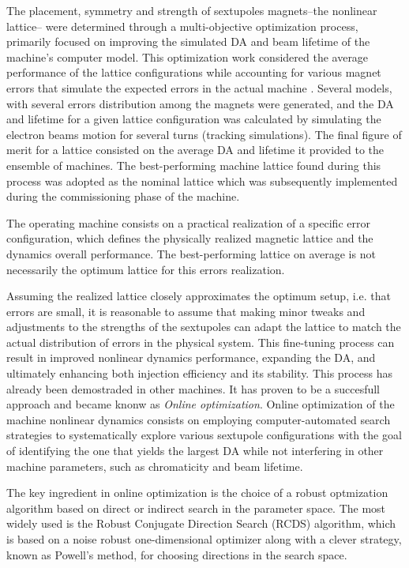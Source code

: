 The placement, symmetry and strength of sextupoles magnets--the nonlinear lattice-- were determined through a multi-objective optimization process, primarily focused on improving the simulated DA and beam lifetime of the machine's computer model\cite{de_sa_optimization_2016, dester_energy_2017}. This optimization work considered the average performance of the lattice configurations while accounting for various magnet errors that simulate the expected errors in the actual machine \cite{de_sa_optimization_2016}. Several models, with several errors distribution among the magnets were generated, and the DA and lifetime for a given lattice configuration was calculated by simulating the electron beams motion for several turns (tracking simulations). The final figure of merit for a lattice consisted on the average DA and lifetime it provided to the ensemble of machines. The best-performing machine lattice found during this process was adopted as the nominal lattice which was subsequently implemented during the commissioning phase of the machine.

The operating machine consists on a practical realization of a specific error configuration, which defines the physically realized magnetic lattice and the dynamics overall performance. The best-performing lattice on average is not necessarily the optimum lattice for this errors realization.

Assuming the realized lattice closely approximates the optimum setup, i.e. that errors are small, it is reasonable to assume that making minor tweaks and adjustments to the strengths of the sextupoles can adapt the lattice to match the actual distribution of errors in the physical system. This fine-tuning process can result in improved nonlinear dynamics performance, expanding the DA, and ultimately enhancing both injection efficiency and its stability. This process has already been demostraded in other machines. It has proven to be a succesfull approach and became knonw as \textit{Online optimization}.
Online optimization of the machine nonlinear dynamics consists on employing computer-automated search strategies to systematically explore various sextupole configurations with the goal of identifying the one that yields the largest DA while not interfering in other machine parameters, such as chromaticity and beam lifetime.

The key ingredient in online optimization is the choice of a robust optmization algorithm based on direct or indirect search in the parameter space. The most widely used is the Robust Conjugate Direction Search (RCDS) algorithm, which is based on a noise robust one-dimensional optimizer along with a clever strategy, known as Powell's method, for choosing directions in the search space.

